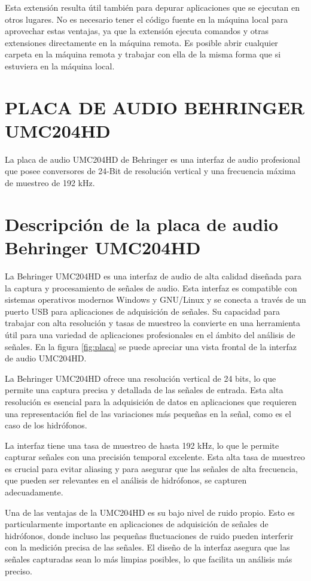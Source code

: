 Esta extensión resulta útil también para depurar aplicaciones que se ejecutan en otros lugares. No es necesario tener el código fuente en la máquina local para aprovechar estas ventajas, ya que la extensión ejecuta comandos y otras extensiones directamente en la máquina remota. Es posible abrir cualquier carpeta en la máquina remota y trabajar con ella de la misma forma que si estuviera en la máquina local.

\clearpage
\section{PLACA DE AUDIO BEHRINGER UMC204HD}

La placa de audio UMC204HD de Behringer es una interfaz de audio profesional que posee conversores de 24-Bit de resolución vertical y una frecuencia máxima de muestreo de 192 kHz. 

\section*{Descripción de la placa de audio Behringer UMC204HD}

La Behringer UMC204HD es una interfaz de audio de alta calidad diseñada para la captura y procesamiento de señales de audio. Esta interfaz es compatible con sistemas operativos modernos Windows y GNU/Linux y se conecta a través de un puerto USB para aplicaciones de adquisición de señales. Su capacidad para trabajar con alta resolución y tasas de muestreo la convierte en una herramienta útil para una variedad de aplicaciones profesionales en el ámbito del análisis de señales. En la figura \ref{fig:placa} se puede apreciar una vista frontal de la interfaz de audio UMC204HD.

La Behringer UMC204HD ofrece una resolución vertical de 24 bits, lo que permite una captura precisa y detallada de las señales de entrada. Esta alta resolución es esencial para la adquisición de datos en aplicaciones que requieren una representación fiel de las variaciones más pequeñas en la señal, como es el caso de los hidrófonos.

La interfaz tiene una tasa de muestreo de hasta 192 kHz, lo que le permite capturar señales con una precisión temporal excelente. Esta alta tasa de muestreo es crucial para evitar aliasing y para asegurar que las señales de alta frecuencia, que pueden ser relevantes en el análisis de hidrófonos, se capturen adecuadamente.

Una de las ventajas de la UMC204HD es su bajo nivel de ruido propio. Esto es particularmente importante en aplicaciones de adquisición de señales de hidrófonos, donde incluso las pequeñas fluctuaciones de ruido pueden interferir con la medición precisa de las señales. El diseño de la interfaz asegura que las señales capturadas sean lo más limpias posibles, lo que facilita un análisis más preciso.

